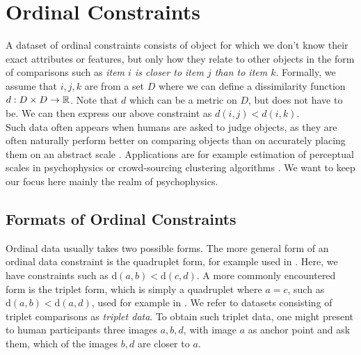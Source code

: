 
\section{Ordinal Constraints}
A dataset of ordinal constraints consists of object for which we don't know their exact attributes or features, but only how they relate to other objects
in the form of comparisons such as \textit{item $i$ is closer to item $j$ than to item $k$}. Formally, we assume that $i, j, k$ are from 
a set $D$ where we can define a dissimilarity function $d: D \times D \to \mathbb{R}$. Note that $d$ which can be a metric on $D$, but does not have to be.
We can then express our above constraint as $d(i, j) < d(i, k)$. \\

Such data often appears when humans are asked to judge objects, as they are often naturally perform better on comparing objects
than on accurately placing them on an abstract scale \cite{stewartAbsoluteIdentificationRelative2005}. Applications are for example estimation of perceptual scales in psychophysics 
\cite{haghiriEstimationPerceptualScales2020} or crowd-sourcing clustering algorithms \cite{ukkonenCrowdsourcedCorrelationClustering2017}. 
We want to keep our focus here mainly the realm of psychophysics.


\subsection{Formats of Ordinal Constraints}
Ordinal data usually takes two possible forms. 
The more general form of an ordinal data constraint is the quadruplet form, for example used in \cite{ghoshdastidarFoundationsComparisonBasedHierarchical2019}. 
Here, we have constraints such as $\text{d}(a,b) < \text{d}(c,d)$. A more commonly encountered form is the triplet form, which is simply a quadruplet where $a = c$, such as
$\text{d}(a,b) < \text{d}(a,d)$, used for example in \cite{vankadaraInsightsOrdinalEmbedding2021,haghiriComparisonBasedFrameworkPsychophysics2019}. We refer to datasets
consisting of triplet comparisons as \textit{triplet data}.
To obtain such triplet data, one might present to human participants three images $a, b, d$, with image $a$ as anchor point and ask them, which of the images $b,d$ are closer to $a$. \\


